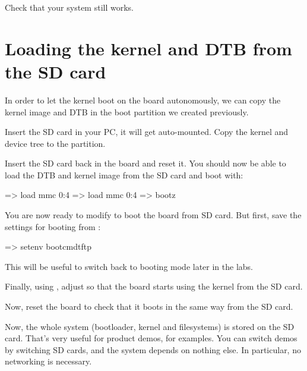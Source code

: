 Check that your system still works.

\section{Loading the kernel and DTB from the SD card}

In order to let the kernel boot on the board autonomously, we can
copy the kernel image and DTB in the boot partition we created
previously.

Insert the SD card in your PC, it will get auto-mounted. Copy the
kernel and device tree to the  partition.

Insert the SD card back in the board and reset it. You should now be
able to load the DTB and kernel image from the SD card and boot with:

\begin{ubootinput}
=> load mmc 0:4 %
=> load mmc 0:4 %
=> bootz %
\end{ubootinput}

You are now ready to modify  to boot the board
from SD card. But first, save the settings for booting from
:

\begin{ubootinput}
=> setenv bootcmdtftp %
\end{ubootinput}

This will be useful to switch back to  booting mode
later in the labs.

Finally, using , adjust  so that
the board starts using the kernel from the SD card.

Now, reset the board to check that it boots in the same way from the
SD card.

Now, the whole system (bootloader, kernel and filesystems) is
stored on the SD card. That's very useful for product demos, for
examples. You can switch demos by switching SD cards, and the
system depends on nothing else. In particular, no networking is
necessary.
